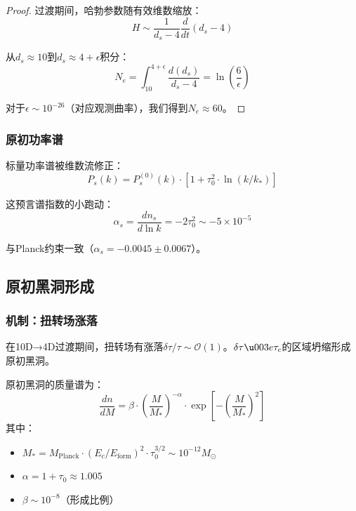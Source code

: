 \begin{proof}
过渡期间，哈勃参数随有效维数缩放：
\begin{equation}
    H \sim \frac{1}{d_s-4} \frac{d}{dt}(d_s-4)
\end{equation}

从$d_s \approx 10$到$d_s \approx 4 + \epsilon$积分：
\begin{equation}
    N_e = \int_{10}^{4+\epsilon} \frac{d(d_s)}{d_s-4} = \ln\left(\frac{6}{\epsilon}\right)
\end{equation}

对于$\epsilon \sim 10^{-26}$（对应观测曲率），我们得到$N_e \approx 60$。
\end{proof}

\subsubsection{原初功率谱}

标量功率谱被维数流修正：
\begin{equation}
    P_s(k) = P_s^{(0)}(k) \cdot \left[1 + \tau_0^2 \cdot \ln(k/k_*)\right]
\end{equation}

这预言谱指数的小跑动：
\begin{equation}
    \alpha_s = \frac{d n_s}{d \ln k} = -2\tau_0^2 \sim -5 \times 10^{-5}
\end{equation}

与Planck约束一致（$\alpha_s = -0.0045 \pm 0.0067$）。

\subsection{原初黑洞形成}

\subsubsection{机制：扭转场涨落}

\begin{insight}[来自密度峰的PBH]
在10D→4D过渡期间，扭转场有涨落$\delta\tau/\tau \sim \mathcal{O}(1)$。$\delta\tau \u003e \tau_c$的区域坍缩形成原初黑洞。
\end{insight}

\begin{theorem}[PBH质量函数]
原初黑洞的质量谱为：
\begin{equation}
    \frac{dn}{dM} = \beta \cdot \left(\frac{M}{M_*}\right)^{-\alpha} \cdot \exp\left[-\left(\frac{M}{M_*}\right)^2\right]
\end{equation}
其中：
\begin{itemize}
    \item $M_* = M_{\text{Planck}} \cdot (E_c/E_{\text{form}})^2 \cdot \tau_0^{3/2} \sim 10^{-12} M_\odot$
    \item $\alpha = 1 + \tau_0 \approx 1.005$
    \item $\beta \sim 10^{-8}$（形成比例）
\end{itemize}
\end{theorem}

